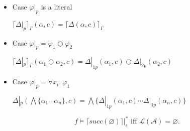 \begin{definition}
\begin{itemize}
\item Case \( \varphi |_p \) is a literal

\( \lceil\Delta|_p\rceil_\Gamma(\alpha, c) = \lceil\Delta(\alpha, c)\rceil_\Gamma \)
\item Case \( \varphi |_p = \varphi_1 \bigcirc \varphi_2 \) 

\( \lceil\Delta|_p\rceil_\Gamma(\alpha_1 \bigcirc \alpha_2, c) = \Delta|_{1p}(\alpha_1, c) \bigcirc \Delta|_{2p}(\alpha_2, c) \)
\item Case \( \varphi |_p = \forall x_i .\ \varphi_1 \) 

\( \Delta|_p(\bigwedge\{\alpha_1 \cdots \alpha_n\}, c) = \bigwedge\{ \Delta|_{1p}(\alpha_1, c) \cdots \Delta|_{1p}(\alpha_n, c)\} \)
\end{itemize}
\end{definition}

\begin{theorem}
 \[ f \models \lceil \mathit{succ}(\varnothing) \rceil|_{\epsilon}^* \text{ iff }
\mathcal{L}(\mathcal{A}) = \varnothing. \]
\end{theorem}
